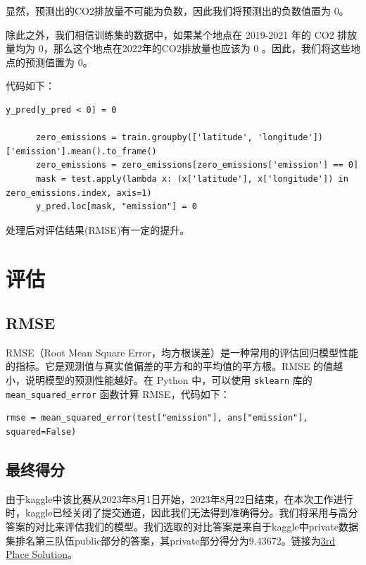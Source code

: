 \documentclass{ctexart}
\begin{document}
显然，预测出的CO2排放量不可能为负数，因此我们将预测出的负数值置为 0。

除此之外，我们相信训练集的数据中，如果某个地点在 2019-2021 年的 CO2 排放量均为 0，那么这个地点在2022年的CO2排放量也应该为 0 。因此，我们将这些地点的预测值置为 0。

代码如下：

\begin{lstlisting}[style=Python]
      y_pred[y_pred < 0] = 0
      
      zero_emissions = train.groupby(['latitude', 'longitude'])['emission'].mean().to_frame()
      zero_emissions = zero_emissions[zero_emissions['emission'] == 0]
      mask = test.apply(lambda x: (x['latitude'], x['longitude']) in zero_emissions.index, axis=1)
      y_pred.loc[mask, "emission"] = 0
\end{lstlisting}

处理后对评估结果(RMSE)有一定的提升。

\section{评估}

\subsection{RMSE}


RMSE（Root Mean Square Error，均方根误差）是一种常用的评估回归模型性能的指标。它是观测值与真实值偏差的平方和的平均值的平方根。RMSE 的值越小，说明模型的预测性能越好。在 Python 中，可以使用 \texttt{sklearn} 库的 \texttt{mean\_squared\_error} 函数计算 RMSE，代码如下：

\begin{lstlisting}[style=Python]
      rmse = mean_squared_error(test["emission"], ans["emission"], squared=False)
\end{lstlisting}

\subsection{最终得分}

由于kaggle中该比赛从2023年8月1日开始，2023年8月22日结束，在本次工作进行时，kaggle已经关闭了提交通道，因此我们无法得到准确得分。我们将采用与高分答案的对比来评估我们的模型。我们选取的对比答案是来自于kaggle中private数据集排名第三队伍public部分的答案，其private部分得分为9.43672。链接为\href{https://www.kaggle.com/competitions/playground-series-s3e20/discussion/433822}{3rd Place Solution}。
\end{document}
